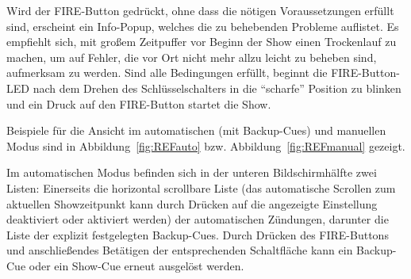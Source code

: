 \documentclass[paper=a4, parskip, numbers=noenddot, toc=listof, headsepline]{scrbook}
\begin{document}
				Wird der FIRE-Button gedrückt, ohne dass die nötigen Voraussetzungen erfüllt sind, erscheint ein Info-Popup, welches die zu behebenden Probleme auflistet. Es empfiehlt sich, mit großem Zeitpuffer vor Beginn der Show einen Trockenlauf zu machen, um auf Fehler, die vor Ort nicht mehr allzu leicht zu beheben sind, aufmerksam zu werden. Sind alle Bedingungen erfüllt, beginnt die FIRE-Button-LED nach dem Drehen des Schlüsselschalters in die \enquote{scharfe} Position zu blinken und ein Druck auf den FIRE-Button startet die Show.

				Beispiele für die Ansicht im automatischen (mit Backup-Cues) und manuellen Modus sind in Abbildung~\ref{fig:REFauto} bzw. Abbildung~\ref{fig:REFmanual} gezeigt.
				
				Im automatischen Modus befinden sich in der unteren Bildschirmhälfte zwei Listen: Einerseits die horizontal scrollbare Liste (das automatische Scrollen zum aktuellen Showzeitpunkt kann durch Drücken auf die angezeigte Einstellung deaktiviert oder aktiviert werden) der automatischen Zündungen, darunter die Liste der explizit festgelegten Backup-Cues. Durch Drücken des FIRE-Buttons und anschließendes Betätigen der entsprechenden Schaltfläche kann ein Backup-Cue oder ein Show-Cue erneut ausgelöst werden.
\end{document}
